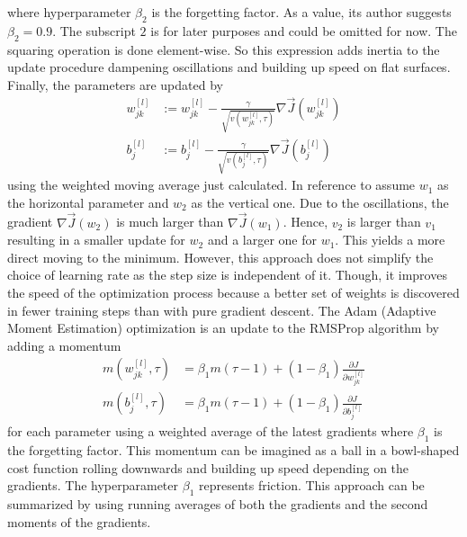 where hyperparameter $\beta_2$ is the forgetting factor.
As a value, its author suggests $\beta_2 = 0.9$.
The subscript $2$ is for later purposes and could be omitted for now.
The squaring operation is done element-wise.
So this expression adds inertia to the update procedure dampening oscillations and building up speed on flat surfaces.
Finally, the parameters are updated by
\begin{subequations}
	\begin{align}
		w^{[l]}_{jk} &:= w^{[l]}_{jk} - \frac{\gamma}{\sqrt{v(w^{[l]}_{jk}, \tau)}} \nabla \vec{J}(w^{[l]}_{jk}) \\
		b^{[l]}_{j} &:= b^{[l]}_{j} - \frac{\gamma}{\sqrt{v(b^{[l]}_{j}, \tau)}} \nabla \vec{J}(b^{[l]}_{j})
	\end{align}
\end{subequations}
using the weighted moving average just calculated.
In reference to  assume $w_1$ as the horizontal parameter and $w_2$ as the vertical one.
Due to the oscillations, the gradient $\nabla \vec{J}(w_2)$ is much larger than $\nabla \vec{J}(w_1)$.
Hence, $v_2$ is larger than $v_1$ resulting in a smaller update for $w_2$ and a larger one for $w_1$.
This yields a more direct moving to the minimum.
However, this approach does not simplify the choice of learning rate as the step size is independent of it.
Though, it improves the speed of the optimization process because a better set of weights is discovered in fewer training steps than with pure gradient descent.
The Adam (Adaptive Moment Estimation) optimization is an update to the RMSProp algorithm by adding a momentum
\begin{subequations}
	\label{eq:adam-first-momentum}
	\begin{align}
		m(w^{[l]}_{jk},\tau) &= \beta_1 m(\tau -1) + (1- \beta_1) \frac{\partial J}{\partial w^{[l]}_{jk}} \\
		m(b^{[l]}_{j},\tau) &= \beta_1 m(\tau -1) + (1- \beta_1) \frac{\partial J}{\partial b^{[l]}_{j}}
	\end{align}
\end{subequations}
for each parameter using a weighted average of the latest gradients\cite{DBLP:journals/corr/KingmaB14} where $\beta_1$ is the forgetting factor.
This momentum can be imagined as a ball in a bowl-shaped cost function rolling downwards and building up speed depending on the gradients.
The hyperparameter $\beta_1$ represents friction.
This approach can be summarized by using running averages of both the gradients and the second moments of the gradients.
